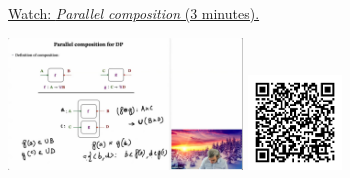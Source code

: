 
\begin{minipage}{10cm}
    \href{https://act4e-spring21.netlify.app/videos/spring2021-functorial-comp-b:solving-queries:solving-parallel.html}{Watch: \emph{Parallel composition} (3 minutes).}
        
    \href{https://act4e-spring21.netlify.app/videos/spring2021-functorial-comp-b:solving-queries:solving-parallel.html}{\includegraphics[height=3.5cm]{spring2021-functorial-comp-b:solving-queries:solving-parallel/thumbnails.jpg}}
    \href{https://act4e-spring21.netlify.app/videos/spring2021-functorial-comp-b:solving-queries:solving-parallel.html}{\includegraphics[height=2.5cm]{spring2021-functorial-comp-b:solving-queries:solving-parallel/qrcode.png}}
\end{minipage}
